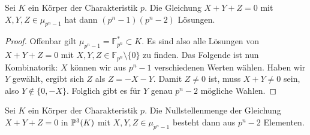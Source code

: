 \begin{lemma}
Sei $K$ ein Körper der Charakteristik $p$. Die Gleichung $X+Y+Z=0$ mit $X,Y,Z \in \mu_{p^n-1}$ hat dann $(p^n-1)(p^n-2)$ Lösungen.
\end{lemma}
\begin{proof}
Offenbar gilt $\mu_{p^n-1} = \mathbb F_{p^n}^* \subset K$. Es sind also alle Lösungen von $X+Y+Z=0$ mit $X,Y,Z \in \mathbb F_{p^n} \setminus \{0\}$ zu finden. Das Folgende ist nun Kombinatorik: $X$ können wir aus $p^n-1$ verschiedenen Werten wählen. Haben wir $Y$ gewählt, ergibt sich $Z$ als $Z=-X-Y$. Damit $Z \neq 0$ ist, muss $X+Y \neq 0$ sein, also $Y \not\in \{0,-X\}$. Folglich gibt es für $Y$ genau $p^n-2$ mögliche Wahlen.
\end{proof}
\begin{coroll} \label{cor:projrootsum}
Sei $K$ ein Körper der Charakteristik $p$. Die Nullstellenmenge der Gleichung $X+Y+Z=0$ in $\mathbb P^{3}(K)$ mit $X,Y,Z \in \mu_{p^n-1}$ besteht dann aus $p^n-2$ Elementen.
\end{coroll}

